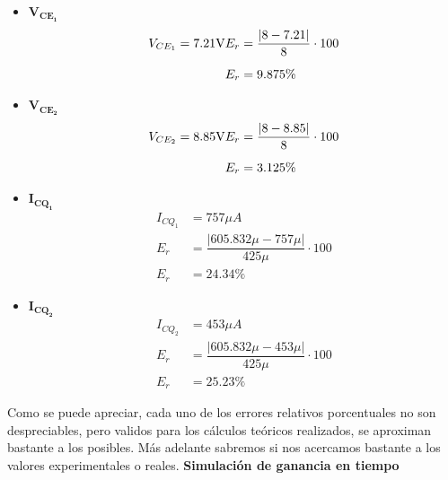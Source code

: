 \begin{enumerate}
        \begin{itemize}
          \item $\mathbf{V_{CE_1}}$
                \begin{align*}
                  V_{CE_1}=7.21\volt
                  E_r & =\dfrac{|8-7.21|}{8}\cdot 100 \\[0.2cm]
                  E_r & =9.875\%
                \end{align*}

          \item $\mathbf{V_{CE_2}}$
                \begin{align*}
                  V_{CE_2}=8.85\volt
                  E_r & =\dfrac{|8-8.85|}{8}\cdot 100 \\[0.2cm]
                  E_r & =3.125\%
                \end{align*}

          \item $\mathbf{I_{CQ_1}}$
                \begin{align*}
                  I_{CQ_1} & =757 \mu A                                    \\[0.2cm]
                  E_r      & =\dfrac{|605.832\mu-757\mu|}{425\mu}\cdot 100 \\[0.2cm]
                  E_r      & =24.34\%
                \end{align*}
          \item $\mathbf{I_{CQ_2}}$
                \begin{align*}
                  I_{CQ_2} & =453 \mu A                                    \\[0.2cm]
                  E_r      & =\dfrac{|605.832\mu-453\mu|}{425\mu}\cdot 100 \\[0.2cm]
                  E_r      & =25.23\%
                \end{align*}
        \end{itemize}


        Como se puede apreciar, cada uno de los errores relativos porcentuales no son despreciables, pero validos para los cálculos teóricos realizados, se aproximan bastante a los posibles. Más adelante sabremos si nos acercamos bastante a los valores experimentales o reales.
        \newpage
        \textbf{Simulación de ganancia en tiempo}


\end{enumerate}
